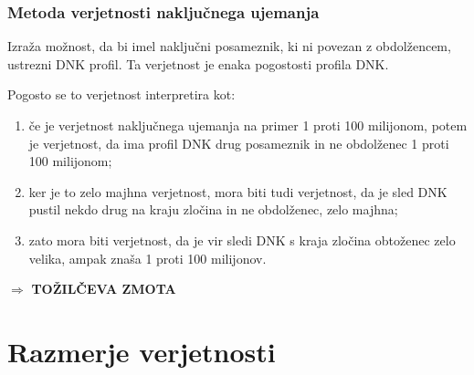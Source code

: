 \documentclass{beamer}
\begin{document}
\begin{frame}
    \frametitle{Metoda verjetnosti naključnega ujemanja}
    \begin{block}{}
        Izraža možnost, da bi imel naključni posameznik, ki ni povezan z obdolžencem, ustrezni DNK profil. Ta verjetnost je enaka pogostosti profila DNK. 
    \end{block}\vspace{2mm}
    Pogosto se to verjetnost interpretira kot:
    \begin{enumerate}
        \item če je verjetnost naključnega ujemanja na primer 1 proti 100 milijonom, potem je verjetnost, da ima profil DNK drug posameznik in ne
        obdolženec 1 proti 100 milijonom;
        \item ker je to zelo majhna verjetnost, mora biti tudi verjetnost, da je sled DNK pustil nekdo drug na kraju zločina in ne obdolženec, zelo majhna;
        \item zato mora biti verjetnost, da je vir sledi DNK s kraja zločina obtoženec zelo velika, ampak znaša 1 proti 100 milijonov.
    \end{enumerate} \vspace{2mm}
    \begin{block}{}
        \centering
        $\Rightarrow$ \textbf{TOŽILČEVA ZMOTA}
    \end{block} 
\end{frame}

\section{Razmerje verjetnosti}
\end{document}
